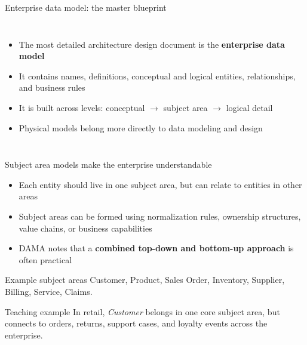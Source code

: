 \documentclass[aspectratio=169,professionalfonts]{beamer}
\newcommand{\sourcefooter}{\vspace{0.4em}{\tiny Source: DAMA-DMBOK2, Chapter 4 (Data Architecture).}}
\begin{document}
\begin{frame}{Enterprise data model: the master blueprint}
\begin{columns}[T,totalwidth=\textwidth]
\begin{itemize}
    \item The most detailed architecture design document is the \textbf{enterprise data model}
    \item It contains names, definitions, conceptual and logical entities, relationships, and business rules
    \item It is built across levels: conceptual \(\rightarrow\) subject area \(\rightarrow\) logical detail
    \item Physical models belong more directly to data modeling and design
\end{itemize}
\centering
{}
\end{columns}
\sourcefooter
\end{frame}

\begin{frame}{Subject area models make the enterprise understandable}
\begin{itemize}
    \item Each entity should live in one subject area, but can relate to entities in other areas
    \item Subject areas can be formed using normalization rules, ownership structures, value chains, or business capabilities
    \item DAMA notes that a \textbf{combined top-down and bottom-up approach} is often practical
\end{itemize}

\begin{block}{Example subject areas}
Customer, Product, Sales Order, Inventory, Supplier, Billing, Service, Claims.
\end{block}

\begin{block}{Teaching example}
In retail, \textit{Customer} belongs in one core subject area, but connects to orders, returns, support cases, and loyalty events across the enterprise.
\end{block}
\sourcefooter
\end{frame}
\end{document}
